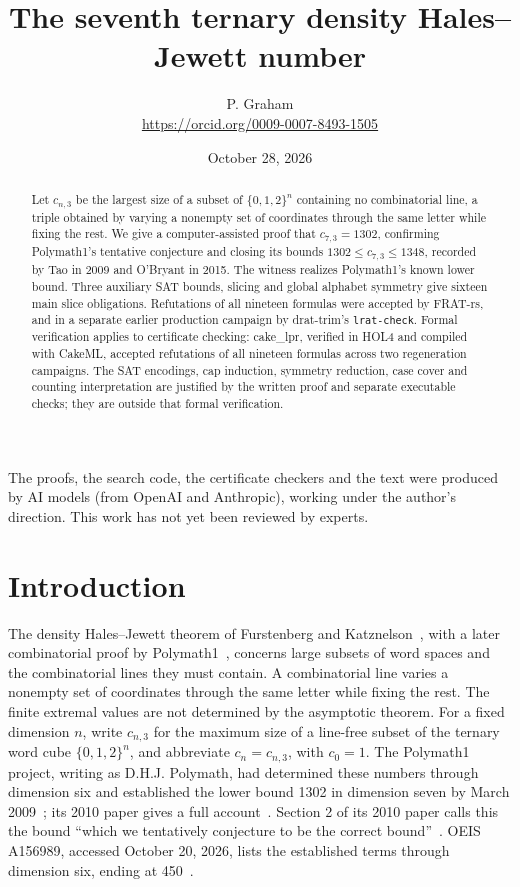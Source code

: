 \documentclass[11pt]{article}
\title{The seventh ternary density Hales--Jewett number}
\author{P. Graham\\ \small\url{https://orcid.org/0009-0007-8493-1505}}
\date{October 28, 2026}
\newcommand{\cube}[1]{\{0,1,2\}^{#1}}
\begin{document}
\maketitle
\begin{abstract}
Let $c_{n,3}$ be the largest size of a subset of $\{0,1,2\}^n$ containing no combinatorial line, a triple obtained by varying a nonempty set of coordinates through the same letter while fixing the rest. We give a computer-assisted proof that $c_{7,3}=1302$, confirming Polymath1's tentative conjecture and closing its bounds $1302\leq c_{7,3}\leq1348$, recorded by Tao in 2009 and O'Bryant in 2015. The witness realizes Polymath1's known lower bound. Three auxiliary SAT bounds, slicing and global alphabet symmetry give sixteen main slice obligations. Refutations of all nineteen formulas were accepted by FRAT-rs, and in a separate earlier production campaign by drat-trim's \texttt{lrat-check}. Formal verification applies to certificate checking: cake\_lpr, verified in HOL4 and compiled with CakeML, accepted refutations of all nineteen formulas across two regeneration campaigns. The SAT encodings, cap induction, symmetry reduction, case cover and counting interpretation are justified by the written proof and separate executable checks; they are outside that formal verification.
\end{abstract}

The proofs, the search code, the certificate checkers and the text were produced by AI models (from OpenAI and Anthropic), working under the author's direction.
This work has not yet been reviewed by experts.

\section{Introduction}
The density Hales--Jewett theorem of Furstenberg and Katznelson~\cite{fk}, with a later combinatorial proof by Polymath1~\cite{annals}, concerns large subsets of word spaces and the combinatorial lines they must contain. A combinatorial line varies a nonempty set of coordinates through the same letter while fixing the rest. The finite extremal values are not determined by the asymptotic theorem. For a fixed dimension $n$, write $c_{n,3}$ for the maximum size of a line-free subset of the ternary word cube $\cube n$, and abbreviate $c_n=c_{n,3}$, with $c_0=1$. The Polymath1 project, writing as D.H.J. Polymath, had determined these numbers through dimension six and established the lower bound 1302 in dimension seven by March 2009~\cite{tao2009}; its 2010 paper gives a full account~\cite[Theorem 1.4 and Sections 2--3]{polymath}. Section 2 of its 2010 paper calls this the bound ``which we tentatively conjecture to be the correct bound''~\cite{polymath}. OEIS A156989, accessed October 20, 2026, lists the established terms through dimension six, ending at 450~\cite{oeis}.
\end{document}
